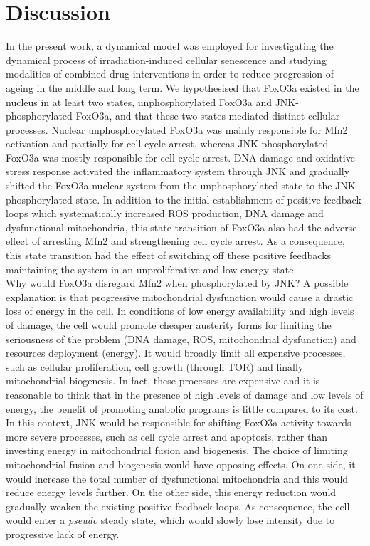 \section{Discussion}
\label{project3-sec:Discussion}
In the present work, a dynamical model was employed for investigating the dynamical process of irradiation-induced cellular senescence and studying modalities of combined drug interventions in order to reduce progression of ageing in the middle and long term. We hypothesised that FoxO3a existed in the nucleus in at least two states, unphosphorylated FoxO3a and JNK-phosphorylated FoxO3a, and that these two states mediated distinct cellular processes. Nuclear unphosphorylated FoxO3a was mainly responsible for Mfn2 activation and partially for cell cycle arrest, whereas JNK-phosphorylated FoxO3a was mostly responsible for cell cycle arrest. DNA damage and oxidative stress response activated the inflammatory system through JNK and gradually shifted the FoxO3a nuclear system from the unphosphorylated state to the JNK-phosphorylated state. In addition to the initial establishment of positive feedback loops which systematically increased ROS production, DNA damage and dysfunctional mitochondria, this state 
transition of FoxO3a also had the adverse effect of arresting Mfn2 and strengthening cell cycle arrest. As a consequence, this state transition had the effect of switching off these positive feedbacks maintaining the system in an unproliferative and low energy state. \\
Why would FoxO3a disregard Mfn2 when phosphorylated by JNK? A possible explanation is that progressive mitochondrial dysfunction would cause a drastic loss of energy in the cell. In conditions of low energy availability and high levels of damage, the cell would promote cheaper austerity forms for limiting the seriousness of the problem (DNA damage, ROS, mitochondrial dysfunction) and resources deployment (energy). It would broadly limit all expensive processes, such as cellular proliferation, cell growth (through TOR) and finally mitochondrial biogenesis. In fact, these processes are expensive and it is reasonable to think that in the presence of high levels of damage and low levels of energy, the benefit of promoting anabolic programs is little compared to its cost. In this context, JNK would be responsible for shifting FoxO3a activity towards more severe processes, such as cell cycle arrest and apoptosis, rather than investing energy in mitochondrial fusion and biogenesis. The choice of limiting 
mitochondrial fusion and biogenesis would have opposing effects. On one side, it would increase the total number of dysfunctional mitochondria and this would reduce energy levels further. On the other side, this energy reduction would gradually weaken the existing positive feedback loops. As consequence, the cell would enter a \emph{pseudo} steady state, which would slowly lose intensity due to progressive lack of energy.\\
